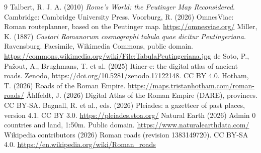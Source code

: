 \documentclass[11pt,a4paper]{article}
\begin{document}
\begin{thebibliography}{9}
 Talbert, R. J. A. (2010) \textit{Rome's World: the Peutinger Map Reconsidered}. Cambridge: Cambridge University Press.
 Voorburg, R. (2026) OmnesViae: Roman routeplanner, based on the Peutinger map. \url{https://omnesviae.org/}
 Miller, K. (1887) \textit{Castori Romanorum cosmographi tabula quae dicitur Peutingeriana}. Ravensburg. Facsimile, Wikimedia Commons, public domain. \url{https://commons.wikimedia.org/wiki/File:TabulaPeutingeriana.jpg}
 de Soto, P., Pa\v{z}out, A., Brughmans, T. et al. (2025) Itiner-e: the digital atlas of ancient roads. Zenodo, \url{https://doi.org/10.5281/zenodo.17122148}. CC BY 4.0.
 Hotham, T. (2026) Roads of the Roman Empire. \url{https://maps.tristanhotham.com/roman-roads/}
 {\AA}hlfeldt, J. (2026) Digital Atlas of the Roman Empire (DARE), provinces. CC BY-SA.
 Bagnall, R. et al., eds. (2026) Pleiades: a gazetteer of past places, version 4.1. CC BY 3.0. \url{https://pleiades.stoa.org/}
 Natural Earth (2026) Admin 0 countries and land, 1:50m. Public domain. \url{https://www.naturalearthdata.com/}
 Wikipedia contributors (2026) Roman roads (revision 1383149720). CC BY-SA 4.0. \url{https://en.wikipedia.org/wiki/Roman_roads}
\end{thebibliography}

\clearpage
\appendix
\end{document}
